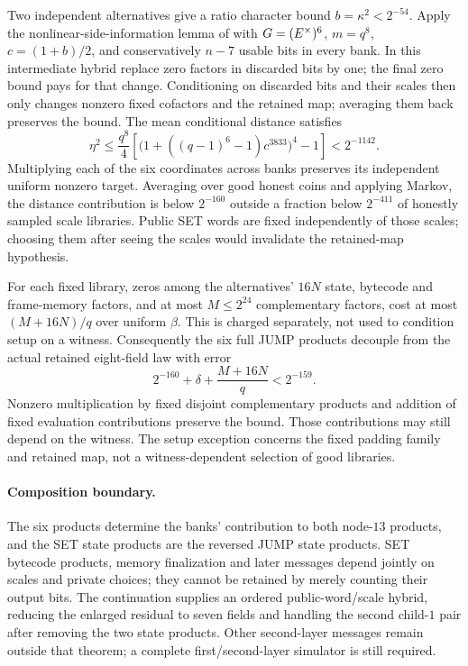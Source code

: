 Two independent alternatives give a ratio character bound $b=\kappa^2<2^{-54}$. Apply the nonlinear-side-information lemma of  with $G=(E^\times)^6$, $m=q^8$, $c=(1+b)/2$, and conservatively $n-7$ usable bits in every bank. In this intermediate hybrid replace zero factors in discarded bits by one; the final zero bound pays for that change. Conditioning on discarded bits and their scales then only changes nonzero fixed cofactors and the retained map; averaging them back preserves the bound. The mean conditional distance satisfies
\[
 \eta^2\le\frac{q^8}{4}
 \left[\bigl(1+((q-1)^6-1)c^{3833}\bigr)^4-1\right]
 <2^{-1142}.
\]
Multiplying each of the six coordinates across banks preserves its independent uniform nonzero target. Averaging over good honest coins and applying Markov, the distance contribution is below $2^{-160}$ outside a fraction below $2^{-411}$ of honestly sampled scale libraries. Public SET words are fixed independently of those scales; choosing them after seeing the scales would invalidate the retained-map hypothesis.

For each fixed library, zeros among the alternatives' $16N$ state, bytecode and frame-memory factors, and at most $M\le2^{24}$ complementary factors, cost at most $(M+16N)/q$ over uniform $\beta$. This is charged separately, not used to condition setup on a witness. Consequently the six full JUMP products decouple from the actual retained eight-field law with error
\[
 2^{-160}+\delta+\frac{M+16N}{q}<2^{-159}.
\]
Nonzero multiplication by fixed disjoint complementary products and addition of fixed evaluation contributions preserve the bound. Those contributions may still depend on the witness. The setup exception concerns the fixed padding family and retained map, not a witness-dependent selection of good libraries.

\paragraph{Composition boundary.} The six products determine the banks' contribution to both node-$13$ products, and the SET state products are the reversed JUMP state products. SET bytecode products, memory finalization and later messages depend jointly on scales and private choices; they cannot be retained by merely counting their output bits. The continuation  supplies an ordered public-word/scale hybrid, reducing the enlarged residual to seven fields and handling the second child-$1$ pair after removing the two state products. Other second-layer messages remain outside that theorem; a complete first/second-layer simulator is still required.

